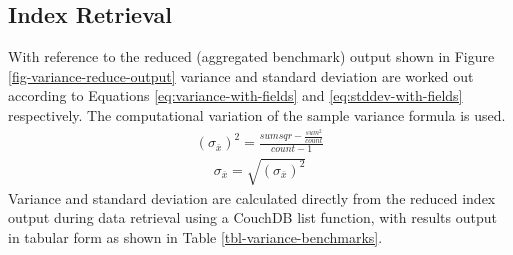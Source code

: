 

\subsection{Index Retrieval}
With reference to the reduced (aggregated benchmark) output shown in Figure \ref{fig-variance-reduce-output} variance and standard deviation are worked out according to Equations \ref{eq:variance-with-fields} and \ref{eq:stddev-with-fields} respectively. The computational variation of the sample variance formula is used.
\begin{align}
  (\sigma_{\overline{x}})^{2} =  \frac{sumsqr - \frac{sum^2}{count}}{count - 1}\label{eq:variance-with-fields}
\end{align}
\begin{align}
  \sigma_{\overline{x}} = \sqrt{(\sigma_{\overline{x}})^{2}}\label{eq:stddev-with-fields}
\end{align}
Variance and standard deviation are calculated directly from the reduced index output during data retrieval using a CouchDB list function, with results output in tabular form as shown in Table \ref{tbl-variance-benchmarks}.

